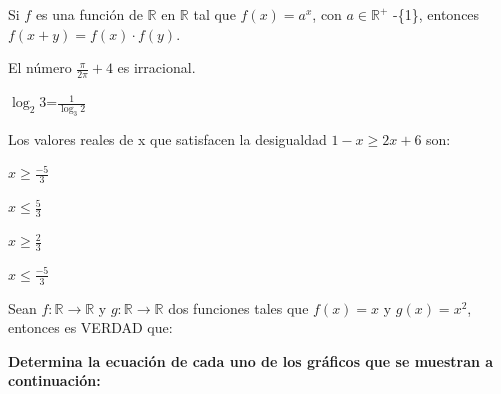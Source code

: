 \documentclass[12pt, addpoints, answers]{exam}
\newcommand{\tf}[1]{\fillin[#1][0.25in]}
\begin{document}
\begin{questions}
\tf{} Si $f$ es una función de $\mathbb{R}$ en $\mathbb{R}$ tal que $f(x)=a^{x}$, con $a \in \mathbb{R}^{+}$ -\{1\}, entonces $f(x+y)=f(x) \cdot f(y)$. %
 
\tf{} El número $\frac{\pi}{2\pi}+4$ es irracional. %

\tf{}$\log_{2}{3}$=$\frac{1}{\log_{3}{2}}$ %

\question[1] Los valores reales de x que satisfacen la desigualdad $1-x\geq2x+6$ son:
\begin{oneparcheckboxes}
	\choice $x\geq \frac{-5}{3}$
	
	\choice $x\leq\frac{5}{3}$
	
	\choice $x\geq\frac{2}{3}$ 
	
	\choice $x\leq\frac{-5}{3}$ %

\end{oneparcheckboxes}

\question[1] Sean $f:\mathbb{R} \rightarrow \mathbb{R}$ y $g:\mathbb{R} \rightarrow \mathbb{R}$ dos funciones tales que $f(x)=x$ y $g(x)=x ^{2}$, entonces es VERDAD que:

\question[2] \textbf{Determina la ecuación de cada uno de los gráficos que se muestran a continuación:}
\par\vspace{0.5em}


\end{questions}
\end{document}
